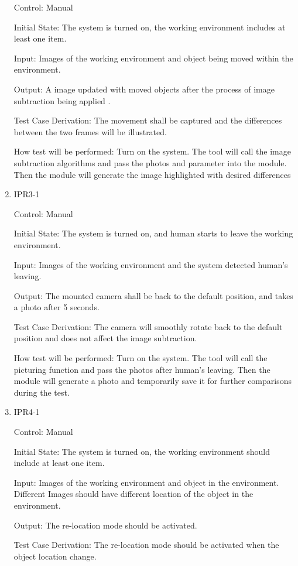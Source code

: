 \documentclass[12pt, titlepage]{article}
\begin{document}
\begin{enumerate}
Control: Manual
					
Initial State: The system is turned on, the working environment includes at least one item.
					
Input: Images of the working environment and object being moved within the environment.
					
Output: A image updated with moved objects after the process of image subtraction being applied .

Test Case Derivation: The movement shall be captured and the differences between the two frames will be illustrated.
					
How test will be performed: Turn on the system. The tool will call the image subtraction algorithms and pass the photos and parameter into the module. Then the module will generate the image highlighted with desired differences

\item{IPR3-1\\}

Control: Manual
					
Initial State: The system is turned on, and human starts to leave the working environment.
					
Input: Images of the working environment and the system detected human's leaving.
					
Output: The mounted camera shall be back to the default position, and takes a photo after 5 seconds.

Test Case Derivation: The camera will smoothly rotate back to the default position and does not affect the image subtraction.
					
How test will be performed: Turn on the system. The tool will call the picturing function and pass the photos after human's leaving. Then the module will generate a photo and temporarily save it for further comparisons during the test.

\item{IPR4-1\\}

Control: Manual
					
Initial State: The system is turned on, the working environment should include at least one item.
					
Input: Images of the working environment and object in the environment. Different Images should have different location of the object in the environment.
					
Output: The re-location mode should be activated.

Test Case Derivation: The re-location mode should be activated when the object location change.
					

\end{enumerate}
\end{document}
